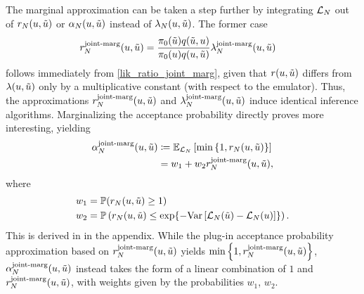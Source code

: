 \documentclass[12pt]{article}
\begin{document}
The marginal approximation can be taken a step further by integrating $\llikEm$ out of 
$\Em[\Ndesign]{\accProbRatio}(\Par, \propPar)$ or $\Em[\Ndesign]{\accProbMH}(\Par, \propPar)$ instead of 
$\Em[\Ndesign]{\likRatio}(\Par, \propPar)$. The former case 
\begin{align}
\llikEmJointMarg[\Ndesign]{\accProbRatio}(\Par, \propPar) 
&= \frac{\priorDens(\propPar) \propDens(\propPar, \Par)}{\priorDens(\Par) \propDens(\Par, \propPar)} 
\llikEmJointMarg[\Ndesign]{\likRatio}(\Par, \propPar)
\label{acc_ratio_joint_marg}
\end{align}
follows immediately from \ref{lik_ratio_joint_marg}, 
given that $\accProbRatio(\Par, \propPar)$ differs from $\likRatio(\Par, \propPar)$ only by a multiplicative 
constant (with respect to the emulator). Thus, the approximations 
$\llikEmJointMarg[\Ndesign]{\accProbRatio}(\Par, \propPar)$ and 
$\llikEmJointMarg[\Ndesign]{\likRatio}(\Par, \propPar)$ induce identical inference algorithms. 
Marginalizing the acceptance probability directly proves more interesting, yielding
\begin{align}
\llikEmJointMarg[\Ndesign]{\accProbMH}(\Par, \propPar) 
&\Def \E_{\llikEm[\Ndesign]} \left[\min\left\{1, \Em[\Ndesign]{\accProbRatio}(\Par, \propPar)\right\} \right] \\
&= w_1 + w_2 \llikEmJointMarg[\Ndesign]{\accProbRatio}(\Par, \propPar),
\label{acc_prob_joint_marg}
\end{align} 
where 
\begin{align*}
w_1 &= \Prob(\Em[\Ndesign]{\accProbRatio}(\Par, \propPar) \geq 1) \\
w_2 &= \Prob\left(\Em[\Ndesign]{\accProbRatio}(\Par, \propPar) \leq \Exp{-\Var\left[\llikEm[\Ndesign](\propPar) - \llikEm[\Ndesign](\Par) \right]}\right).
\end{align*}
This is derived in  in the appendix. While the plug-in acceptance probability 
approximation based on $\llikEmJointMarg[\Ndesign]{\accProbRatio}(\Par, \propPar)$ yields 
$\min\left\{1, \llikEmJointMarg[\Ndesign]{\accProbRatio}(\Par, \propPar) \right\}$, 
$\llikEmJointMarg[\Ndesign]{\accProbMH}(\Par, \propPar)$ instead takes the form of a linear combination of 
$1$ and $\llikEmJointMarg[\Ndesign]{\accProbRatio}(\Par, \propPar)$, with weights given by the probabilities $w_1$, $w_2$.
\end{document}
